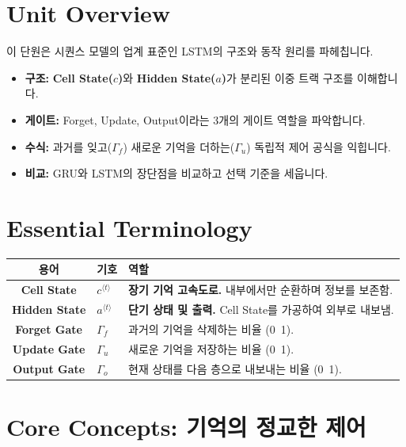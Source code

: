 \documentclass[11pt,a4paper]{book}
\theoremstyle{definition}
\begin{document}
\section{Unit Overview}
\begin{summarybox}[title={핵심 목표}]
이 단원은 시퀀스 모델의 업계 표준인 LSTM의 구조와 동작 원리를 파헤칩니다.
\begin{itemize}
    \item \textbf{구조:} \textbf{Cell State($c$)}와 \textbf{Hidden State($a$)}가 분리된 이중 트랙 구조를 이해합니다.
    \item \textbf{게이트:} Forget, Update, Output이라는 3개의 게이트 역할을 파악합니다.
    \item \textbf{수식:} 과거를 잊고($\Gamma_f$) 새로운 기억을 더하는($\Gamma_u$) 독립적 제어 공식을 익힙니다.
    \item \textbf{비교:} GRU와 LSTM의 장단점을 비교하고 선택 기준을 세웁니다.
\end{itemize}
\end{summarybox}

\section{Essential Terminology}
\begin{center}
\begin{tabular}{|c|l|l|}
\hline
\textbf{용어} & \textbf{기호} & \textbf{역할} \\ \hline
\textbf{Cell State} & $c^{\langle t \rangle}$ & \textbf{장기 기억 고속도로.} 내부에서만 순환하며 정보를 보존함. \\ \hline
\textbf{Hidden State} & $a^{\langle t \rangle}$ & \textbf{단기 상태 및 출력.} Cell State를 가공하여 외부로 내보냄. \\ \hline
\textbf{Forget Gate} & $\Gamma_f$ & 과거의 기억을 삭제하는 비율 (0~1). \\ \hline
\textbf{Update Gate} & $\Gamma_u$ & 새로운 기억을 저장하는 비율 (0~1). \\ \hline
\textbf{Output Gate} & $\Gamma_o$ & 현재 상태를 다음 층으로 내보내는 비율 (0~1). \\ \hline
\end{tabular}
\end{center}

\section{Core Concepts: 기억의 정교한 제어}
\end{document}
